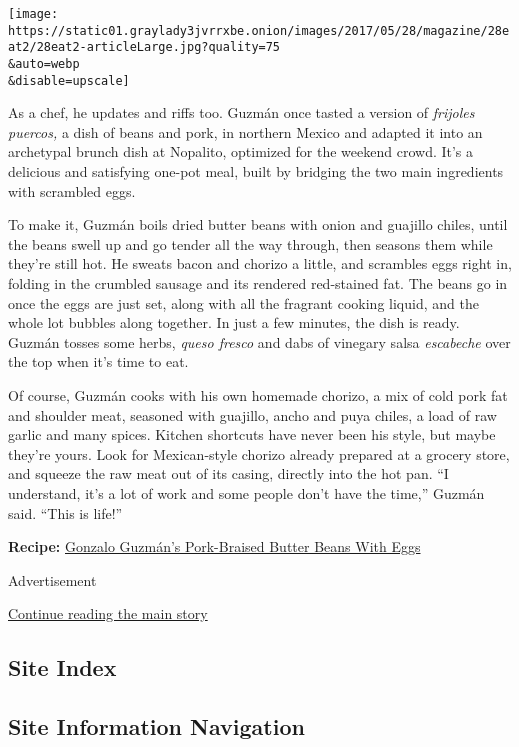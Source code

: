 \texttt{[image: https://static01.graylady3jvrrxbe.onion/images/2017/05/28/magazine/28eat2/28eat2-articleLarge.jpg?quality=75\\\&auto=webp\\\&disable=upscale]}

As a chef, he updates and riffs too. Guzmán once tasted a version of
\emph{frijoles puercos,} a dish of beans and pork, in northern Mexico
and adapted it into an archetypal brunch dish at Nopalito, optimized for
the weekend crowd. It's a delicious and satisfying one-pot meal, built
by bridging the two main ingredients with scrambled eggs.

To make it, Guzmán boils dried butter beans with onion and guajillo
chiles, until the beans swell up and go tender all the way through, then
seasons them while they're still hot. He sweats bacon and chorizo a
little, and scrambles eggs right in, folding in the crumbled sausage and
its rendered red-stained fat. The beans go in once the eggs are just
set, along with all the fragrant cooking liquid, and the whole lot
bubbles along together. In just a few minutes, the dish is ready. Guzmán
tosses some herbs, \emph{queso fresco} and dabs of vinegary salsa
\emph{escabeche} over the top when it's time to eat.

Of course, Guzmán cooks with his own homemade chorizo, a mix of cold
pork fat and shoulder meat, seasoned with guajillo, ancho and puya
chiles, a load of raw garlic and many spices. Kitchen shortcuts have
never been his style, but maybe they're yours. Look for Mexican-style
chorizo already prepared at a grocery store, and squeeze the raw meat
out of its casing, directly into the hot pan. ``I understand, it's a lot
of work and some people don't have the time,'' Guzmán said. ``This is
life!''

\textbf{Recipe:}
\href{https://cooking.nytimes3xbfgragh.onion/recipes/1018774-gonzalo-guzmans-pork-braised-butter-beans-with-eggs}{Gonzalo
Guzmán's Pork-Braised Butter Beans With Eggs}

Advertisement

\protect\hyperlink{after-bottom}{Continue reading the main story}

\hypertarget{site-index}{%
\subsection{Site Index}\label{site-index}}

\hypertarget{site-information-navigation}{%
\subsection{Site Information
Navigation}\label{site-information-navigation}}

